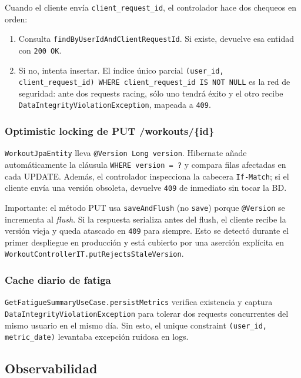 \documentclass[11pt,a4paper]{article}
\newcommand{\cls}[1]{\texttt{\small #1}}
\begin{document}
Cuando el cliente envía \texttt{client\_request\_id}, el controlador hace dos chequeos en orden:

\begin{enumerate}[leftmargin=*]
  \item Consulta \texttt{findByUserIdAndClientRequestId}. Si existe, devuelve esa entidad con \texttt{200 OK}.
  \item Si no, intenta insertar. El índice único parcial \texttt{(user\_id, client\_request\_id) WHERE client\_request\_id IS NOT NULL} es la red de seguridad: ante dos requests racing, sólo uno tendrá éxito y el otro recibe \texttt{DataIntegrityViolationException}, mapeada a \texttt{409}.
\end{enumerate}

\subsubsection{Optimistic locking de PUT /workouts/\{id\}}

\cls{WorkoutJpaEntity} lleva \texttt{@Version Long version}. Hibernate añade automáticamente la cláusula \texttt{WHERE version = ?} y compara filas afectadas en cada UPDATE. Además, el controlador inspecciona la cabecera \texttt{If-Match}; si el cliente envía una versión obsoleta, devuelve \texttt{409} de inmediato sin tocar la BD.

Importante: el método PUT usa \texttt{saveAndFlush} (no \texttt{save}) porque \texttt{@Version} se incrementa al \textit{flush}. Si la respuesta serializa antes del flush, el cliente recibe la versión vieja y queda atascado en \texttt{409} para siempre. Esto se detectó durante el primer despliegue en producción y está cubierto por una aserción explícita en \cls{WorkoutControllerIT.putRejectsStaleVersion}.

\subsubsection{Cache diario de fatiga}

\cls{GetFatigueSummaryUseCase.persistMetrics} verifica existencia y captura \texttt{DataIntegrityViolationException} para tolerar dos requests concurrentes del mismo usuario en el mismo día. Sin esto, el unique constraint \texttt{(user\_id, metric\_date)} levantaba excepción ruidosa en logs.

\subsection{Observabilidad}
\end{document}
